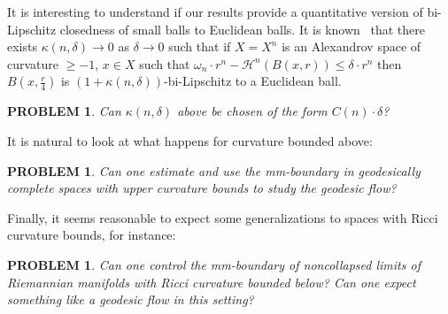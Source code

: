 \documentclass[12pt,leqno,intlimits]{amsart}
\numberwithin{equation}{section}
\newtheorem{quest}[thm]{PROBLEM}
\theoremstyle{definition}
\theoremstyle{remark}
\begin{document}
It is interesting to understand if our results provide a quantitative version of bi-Lipschitz closedness of small balls to Euclidean balls.
It is known~\cite{BGP} that there exists $\kappa(n,\delta)\to 0$ as $\delta\to 0$ such that if $X=X^n$ is an Alexandrov space of curvature $\ge -1$, $x\in X$ such that $\omega _n{\cdot}r^n -\mathcal H^n (B (x,r)) \leq \delta \cdot r ^n$ then $B (x,{\frac r 4})$ is $(1+\kappa(n,\delta))$-bi-Lipschitz to a Euclidean ball.
\begin{quest}
Can $\kappa(n,\delta)$ above be chosen
of the form $C(n)\cdot \delta$?
\end{quest}

It is natural to look at what happens for curvature bounded above:

\begin{quest} \label{qe:CAT}
Can one estimate and use the mm-boundary in geodesically complete spaces with upper curvature bounds to study the geodesic flow?
\end{quest}

Finally, it seems reasonable to expect some generalizations to spaces with Ricci curvature bounds, for instance:

\begin{quest}
Can one control the mm-boundary of noncollapsed limits of Riemannian manifolds with Ricci curvature bounded below? Can one expect something like a geodesic flow in this setting?
\end{quest}
\end{document}
